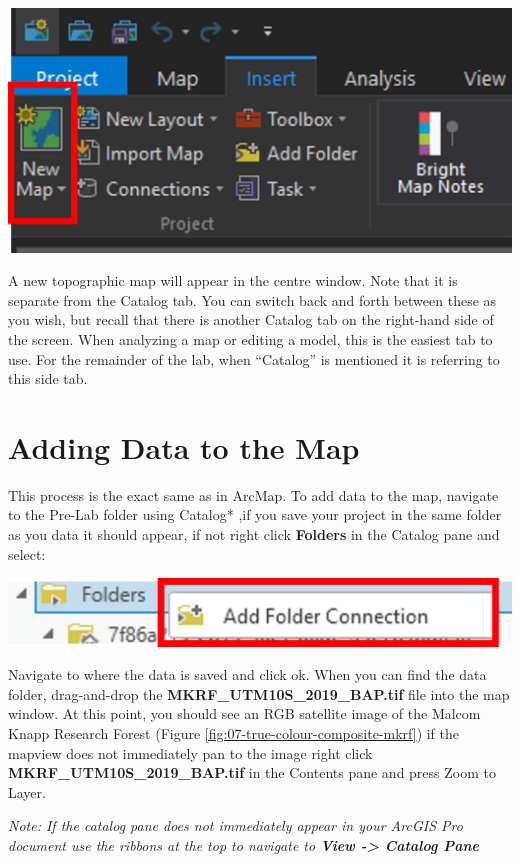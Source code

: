 \documentclass[
]{book}
\begin{document}
\begin{center}\includegraphics[width=0.5\linewidth]{images/01-new-map} \end{center}

A new topographic map will appear in the centre window. Note that it is separate from the Catalog tab. You can switch back and forth between these as you wish, but recall that there is another Catalog tab on the right-hand side of the screen. When analyzing a map or editing a model, this is the easiest tab to use. For the remainder of the lab, when ``Catalog'' is mentioned it is referring to this side tab.

\hypertarget{adding-data-to-the-map}{%
\section*{Adding Data to the Map}\label{adding-data-to-the-map}}

This process is the exact same as in ArcMap. To add data to the map, navigate to the Pre-Lab folder using Catalog* ,if you save your project in the same folder as you data it should appear, if not right click \textbf{Folders} in the Catalog pane and select:

\begin{center}\includegraphics[width=0.5\linewidth]{images/01-add-folder-connection} \end{center}

Navigate to where the data is saved and click ok. When you can find the data folder, drag-and-drop the \textbf{MKRF\_UTM10S\_2019\_BAP.tif} file into the map window. At this point, you should see an RGB satellite image of the Malcom Knapp Research Forest (Figure \ref{fig:07-true-colour-composite-mkrf}) if the mapview does not immediately pan to the image right click \textbf{MKRF\_UTM10S\_2019\_BAP.tif } in the Contents pane and press Zoom to Layer.

\emph{Note: If the catalog pane does not immediately appear in your ArcGIS Pro document use the ribbons at the top to navigate to \textbf{View -\textgreater{} Catalog Pane}}
\end{document}
